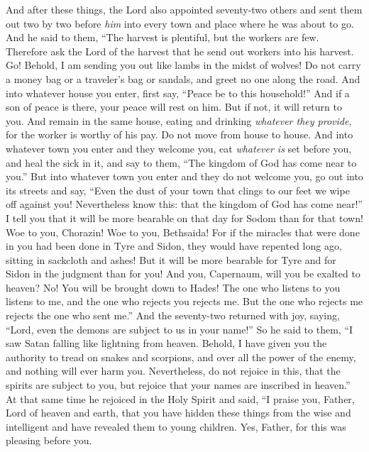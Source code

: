 \begin{biblechapter} %
 And after these things, the Lord also appointed seventy-two others and sent them out two by two before \textit{him} into every town and place where he was about to go.
\verse And he said to them, “The harvest is plentiful, but the workers are few. Therefore ask the Lord of the harvest that he send out workers into his harvest.
\verse Go! Behold, I am sending you out like lambs in the midst of wolves!
\verse Do not carry a money bag or a traveler’s bag or sandals, and greet no one along the road.
\verse And into whatever house you enter, first say, “Peace be to this household!”
\verse And if a son of peace is there, your peace will rest on him. But if not, it will return to you.
\verse And remain in the same house, eating and drinking \textit{whatever they provide}, for the worker is worthy of his pay. Do not move from house to house.
\verse And into whatever town you enter and they welcome you, eat \textit{whatever is} set before you,
\verse and heal the sick in it, and say to them, “The kingdom of God has come near to you.”
\verse But into whatever town you enter and they do not welcome you, go out into its streets and say,
\verse “Even the dust of your town that clings to our feet we wipe off against you! Nevertheless know this: that the kingdom of God has come near!”
\verse I tell you that it will be more bearable on that day for Sodom than for that town!
\verse Woe to you, Chorazin! Woe to you, Bethsaida! For if the miracles that were done in you had been done in Tyre and Sidon, they would have repented long ago, sitting in sackcloth and ashes!
\verse But it will be more bearable for Tyre and for Sidon in the judgment than for you!
\verse And you, Capernaum, will you be exalted to heaven? No! You will be brought down to Hades!
\verse The one who listens to you listens to me, and the one who rejects you rejects me. But the one who rejects me rejects the one who sent me.”
\verse And the seventy-two returned with joy, saying, “Lord, even the demons are subject to us in your name!”
\verse So he said to them, “I saw Satan falling like lightning from heaven.
\verse Behold, I have given you the authority to tread on snakes and scorpions, and over all the power of the enemy, and nothing will ever harm you.
\verse Nevertheless, do not rejoice in this, that the spirits are subject to you, but rejoice that your names are inscribed in heaven.”
 At that same time he rejoiced in the Holy Spirit and said, “I praise you, Father, Lord of heaven and earth, that you have hidden these things from the wise and intelligent and have revealed them to young children. Yes, Father, for this was pleasing before you.

\end{biblechapter}
